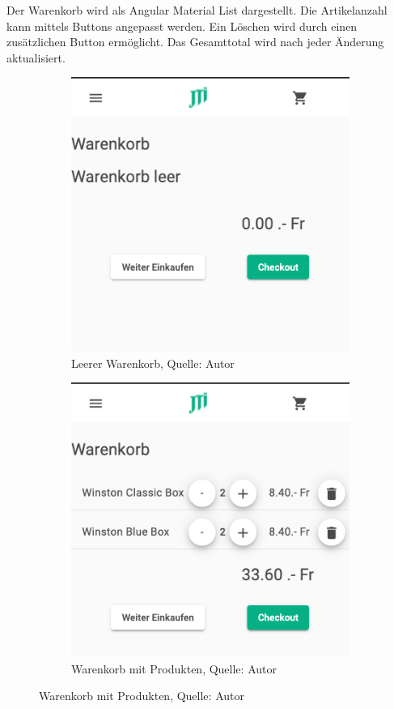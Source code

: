 Der Warenkorb wird als Angular Material List dargestellt. Die Artikelanzahl kann mittels Buttons angepasst werden. Ein Löschen wird durch einen zusätzlichen Button ermöglicht. Das Gesamttotal wird nach jeder Änderung aktualisiert. 

\begin{figure}[H]
	\begin{subfigure}[b]{0.4\textwidth}
		\includegraphics[scale=0.4]{images/cartEmpty.PNG}
		\caption[Leerer Warenkorb]{Leerer Warenkorb, Quelle: Autor}
		\label{img: cartEmpty}
	\end{subfigure}
	\hfill
	\begin{subfigure}[b]{0.4\textwidth}
		\includegraphics[scale=0.4]{images/cartFull.PNG}
		\caption[Warenkorb mit Produkten]{Warenkorb mit Produkten, Quelle: Autor}
		\label{img: cartFull}
	\end{subfigure}
\end{figure} 

